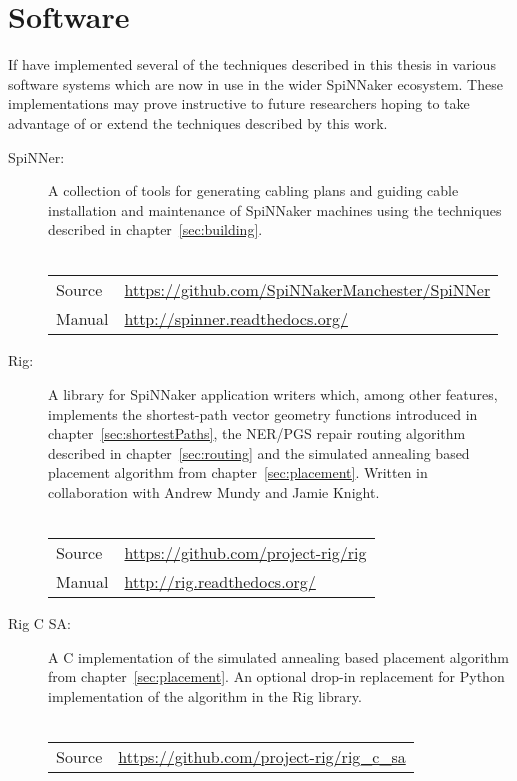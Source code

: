 \chapter{Software}
	\label{sec:software}
	
	If have implemented several of the techniques described in this thesis
	in various software systems which are now in use in the wider SpiNNaker
	ecosystem. These implementations may prove instructive to future researchers
	hoping to take advantage of or extend the techniques described by this work.
	
	\begin{description}
		
		\item [SpiNNer:] A collection of tools for generating cabling plans and
		guiding cable installation and maintenance of SpiNNaker machines using the
		techniques described in chapter~\ref{sec:building}.
		\\
		\vspace*{-1.25em}
		\\
		\begin{tabular}{ll}
			Source & \url{https://github.com/SpiNNakerManchester/SpiNNer} \\
			Manual & \url{http://spinner.readthedocs.org/} \\
		\end{tabular}
		
		\item [Rig:] A library for SpiNNaker application writers which, among other
		features, implements the shortest-path vector geometry functions introduced
		in chapter~\ref{sec:shortestPaths}, the NER/PGS repair routing algorithm
		described in chapter~\ref{sec:routing} and the simulated annealing based
		placement algorithm from chapter~\ref{sec:placement}. Written in
		collaboration with Andrew Mundy and Jamie Knight.
		\\
		\vspace*{-1.25em}
		\\
		\begin{tabular}{ll}
			Source & \url{https://github.com/project-rig/rig} \\
			Manual & \url{http://rig.readthedocs.org/} \\
		\end{tabular}
		
		\item [Rig C SA:] A C implementation of the simulated annealing based
		placement algorithm from chapter~\ref{sec:placement}. An optional drop-in
		replacement for Python implementation of the algorithm in the Rig library.
		\\
		\vspace*{-1.25em}
		\\
		\begin{tabular}{ll}
			Source & \url{https://github.com/project-rig/rig_c_sa} \\
		\end{tabular}
		

\end{description}
